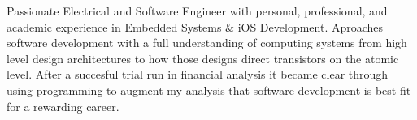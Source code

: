 

\begin{cvparagraph}

Passionate Electrical and Software Engineer with personal, professional, and academic experience in Embedded Systems \& iOS Development. Aproaches software development with a full understanding of computing systems from high level design architectures to how those designs direct transistors on the atomic level. After a succesful trial run in financial analysis it became clear through using programming to augment my analysis that software development is best fit for a rewarding career.

\end{cvparagraph}
